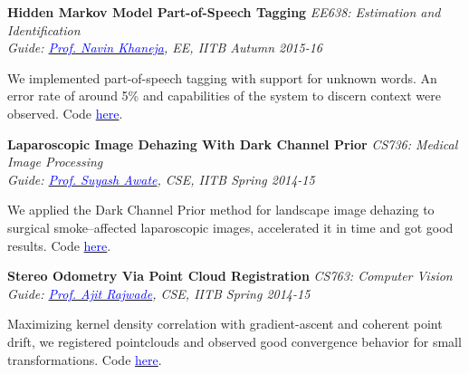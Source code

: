 \documentclass[margin,line]{res}
\newenvironment{list1}{
  \begin{list}{\ding{113}}{%
      \setlength{\itemsep}{0in}
      \setlength{\parsep}{0in} \setlength{\parskip}{0in}
      \setlength{\topsep}{0in} \setlength{\partopsep}{0in} 
      \setlength{\leftmargin}{0.17in}}}{\end{list}}
\begin{document}
\begin{resume}
\vspace*{-0.1in}

{\bf Hidden Markov Model Part-of-Speech Tagging} \hfill \textit{EE638: Estimation and Identification} \\
{\em Guide: \href{https://www.ee.iitb.ac.in/course/~ee638/Navin}{\textcolor{blue}{Prof. Navin Khaneja}}, EE, IITB \hfill Autumn 2015-16} \\
\vspace*{-.15in}
\begin{list1}
\item[] We implemented part-of-speech tagging with support for unknown words. An error rate of around 5\% and capabilities of the system to discern context were observed. Code \href{https://github.com/alankarkotwal/pos-tagging}{\textcolor{blue} {here}}.
\end{list1}

\vspace*{-0.1in}

{\bf Laparoscopic Image Dehazing With Dark Channel Prior} \hfill \textit{CS736: Medical Image Processing} \\
{\em Guide: \href{https://www.cse.iitb.ac.in/~suyash}{\textcolor{blue}{Prof. Suyash Awate}}, CSE, IITB \hfill Spring 2014-15} \\
\vspace*{-.15in}
\begin{list1}
\item[] We applied the Dark Channel Prior method for landscape image dehazing to surgical smoke--affected laparoscopic images, accelerated it in time and got good results. Code \href{https://github.com/riddhishb/Laproscopic-Image-Dehazing}{\textcolor{blue} {here}}.
\end{list1}

\vspace*{-0.1in}

{\bf Stereo Odometry Via Point Cloud Registration} \hfill \textit{CS763: Computer Vision} \\
{\em Guide: \href{https://www.cse.iitb.ac.in/~ajitvr}{\textcolor{blue}{Prof. Ajit Rajwade}}, CSE, IITB \hfill Spring 2014-15} \\
\vspace*{-.15in}
\begin{list1}
\item[] Maximizing kernel density correlation with gradient-ascent and coherent point drift, we registered pointclouds and observed good convergence behavior for small transformations. Code \href{https://github.com/alankarkotwal/stereo-vo}{\textcolor{blue} {here}}.
\end{list1}


\end{resume}
\end{document}
